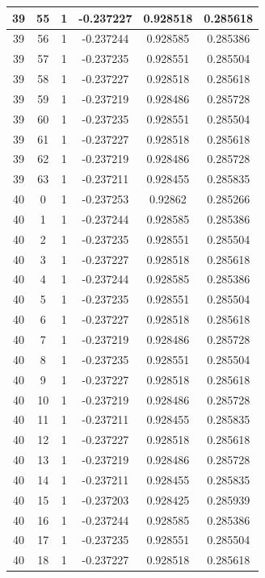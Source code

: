 \documentclass[12pt,a4paper]{article}
\numberwithin{equation}{section}
\numberwithin{figure}{section}
\numberwithin{table}{section}
\begin{document}
\begin{longtable}{|c|c|c|c|c|c|}
39 & 55 & 1 & -0.237227 & 0.928518 & 0.285618 \\ \hline
39 & 56 & 1 & -0.237244 & 0.928585 & 0.285386 \\ \hline
39 & 57 & 1 & -0.237235 & 0.928551 & 0.285504 \\ \hline
39 & 58 & 1 & -0.237227 & 0.928518 & 0.285618 \\ \hline
39 & 59 & 1 & -0.237219 & 0.928486 & 0.285728 \\ \hline
39 & 60 & 1 & -0.237235 & 0.928551 & 0.285504 \\ \hline
39 & 61 & 1 & -0.237227 & 0.928518 & 0.285618 \\ \hline
39 & 62 & 1 & -0.237219 & 0.928486 & 0.285728 \\ \hline
39 & 63 & 1 & -0.237211 & 0.928455 & 0.285835 \\ \hline
40 & 0 & 1 & -0.237253 & 0.92862 & 0.285266 \\ \hline
40 & 1 & 1 & -0.237244 & 0.928585 & 0.285386 \\ \hline
40 & 2 & 1 & -0.237235 & 0.928551 & 0.285504 \\ \hline
40 & 3 & 1 & -0.237227 & 0.928518 & 0.285618 \\ \hline
40 & 4 & 1 & -0.237244 & 0.928585 & 0.285386 \\ \hline
40 & 5 & 1 & -0.237235 & 0.928551 & 0.285504 \\ \hline
40 & 6 & 1 & -0.237227 & 0.928518 & 0.285618 \\ \hline
40 & 7 & 1 & -0.237219 & 0.928486 & 0.285728 \\ \hline
40 & 8 & 1 & -0.237235 & 0.928551 & 0.285504 \\ \hline
40 & 9 & 1 & -0.237227 & 0.928518 & 0.285618 \\ \hline
40 & 10 & 1 & -0.237219 & 0.928486 & 0.285728 \\ \hline
40 & 11 & 1 & -0.237211 & 0.928455 & 0.285835 \\ \hline
40 & 12 & 1 & -0.237227 & 0.928518 & 0.285618 \\ \hline
40 & 13 & 1 & -0.237219 & 0.928486 & 0.285728 \\ \hline
40 & 14 & 1 & -0.237211 & 0.928455 & 0.285835 \\ \hline
40 & 15 & 1 & -0.237203 & 0.928425 & 0.285939 \\ \hline
40 & 16 & 1 & -0.237244 & 0.928585 & 0.285386 \\ \hline
40 & 17 & 1 & -0.237235 & 0.928551 & 0.285504 \\ \hline
40 & 18 & 1 & -0.237227 & 0.928518 & 0.285618 \\ \hline

\end{longtable}
\end{document}
